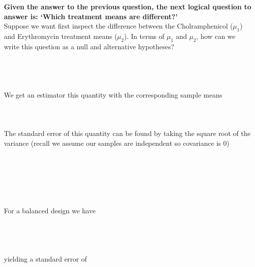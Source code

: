 \newpage

\Large\textbf{Given the answer to the previous question, the next logical question to answer is: `Which treatment means are different?'}\large \\

Suppose we want first inspect the difference between the Cholramphenicol ($\mu_{1}$) and Erythromycin treatment means ($\mu_{2}$).  In terms of $\mu_{1}$ and $\mu_{2}$, how can we write this question as a null and alternative hypotheses?\\~\\~\\~\\~\\

We get an estimator this quantity with the corresponding sample means\\~\\~\\~\\

The standard error of this quantity can be found by taking the square root of the variance (recall we assume our samples are independent so covariance is 0)\\~\\~\\~\\~\\~\\~\\

For a balanced design we have\\~\\~\\~\\~\\
yielding a standard error of\\~\\~\\~\\~\\

